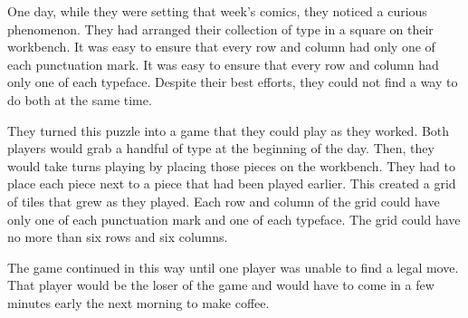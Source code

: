 \documentclass[a4paper, DIV=15]{scrartcl}
\begin{document}
\begin{pullquote}
One day, while they were setting that week's comics, they noticed a curious phenomenon. They had arranged their collection of type in a square on their workbench. It was easy to ensure that every row and column had only one of each punctuation mark. It was easy to ensure that every row and column had only one of each typeface. Despite their best efforts, they could not find a way to do both at the same time.

They turned this puzzle into a game that they could play as they worked. Both players would grab a handful of type at the beginning of the day. Then, they would take turns playing by placing those pieces on the workbench. They had to place each piece next to a piece that had been played earlier. This created a grid of tiles that grew as they played. Each row and column of the grid could have only one of each punctuation mark and one of each typeface. The grid could have no more than six rows and six columns.

The game continued in this way until one player was unable to find a legal move. That player would be the loser of the game and would have to come in a few minutes early the next morning to make coffee.

\end{pullquote}
\end{document}
